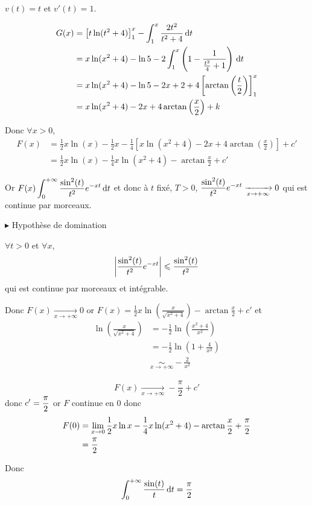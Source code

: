 \begin{exemple}
    $v(t) = t$ et $v'(t) = 1$.

    \begin{align}
        G(x) & = \left[ t \ln(t^2 + 4) \right]_1^x - \int_1^x \frac{2t^2}{t^2 + 4} \,\mathrm{d}t \\
        & = x \ln(x^2 + 4) - \ln 5 - 2 \int_1^x \left( 1 - \frac 1 {\frac{t^2}{4} + 1} \right) \,\mathrm{d}t \\
        & = x \ln(x^2 + 4) - \ln 5 - 2x + 2  + 4 \left[ \arctan \left( \frac t 2 \right) \right]_1^x \\
        & = x \ln(x^2 + 4) - 2x + 4 \arctan \left( \frac x 2 \right) + k
    \end{align}

    Donc $\forall x > 0$, 
    \begin{align}
        F(x) & = \frac 1 2 x \ln(x) - \frac 1 2 x - \frac 1 4 \left[ x \ln(x^2 + 4) - 2x + 4 \arctan \left( \frac x 2 \right) \right] + c' \\
        & = \frac 1 2 x \ln(x) - \frac 1 4 x \ln(x^2 + 4) -  \arctan \frac x 2 + c'
    \end{align}

    Or $\displaystyle F(x) \int_{0}^{+ \infty} \frac{\sin^2(t)}{t^2} e^{-xt} \,\mathrm{d}t$ 
    et donc à $t$ fixé, $T > 0$, $\displaystyle \frac{\sin^2(t)}{t^2} e^{-xt} \xrightarrow[x \to + \infty]{} 0$ qui est continue par morceaux.

    \avspace $\blacktriangleright$ Hypothèse de domination

    $\forall t > 0$ et $\forall x$, $$\displaystyle \left| \frac{\sin^2(t)}{t^2}e^{-xt} \right| \leqslant \frac{\sin^2(t)}{t^2}$$ qui est continue par morceaux et intégrable.

    Donc $F(x) \xrightarrow[x \to + \infty]{} 0$ or $F(x) = \frac 1 2x \ln\left( \frac{x}{\sqrt{x^2 + 4}}\right) - \arctan \frac x 2 + c'$
    et 
    \begin{align}
        \ln \left( \frac x {\sqrt{x^2 + 4}} \right) & = - \frac 1 2 \ln\left( \frac{x^2 + 4}{x^2} \right) \\
        & = - \frac 1 2 \ln\left( 1 + \frac 4 {x^2} \right) \\
        & \underset{x \to + \infty}{\sim} - \frac 2 {x^2}
    \end{align}

    $$F(x) \xrightarrow[x \to + \infty]{} - \frac \pi 2 + c'$$ donc $\displaystyle c' = \frac \pi 2$ 
    or $F$ continue en $0$ donc 
    \begin{align}
        F(0) & = \displaystyle \lim_{x \to 0} \frac 1 2 x \ln x - \frac 1 4 x \ln (x^2 + 4) - \arctan \frac x 2 + \frac \pi 2 \\
        & = \frac \pi 2
    \end{align}

    Donc 
    $$\int_0^{+ \infty} \frac{\sin(t)}{t} \,\mathrm{d}t = \frac \pi 2$$
\end{exemple}

